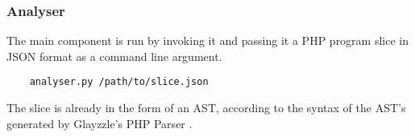 \subsubsection*{Analyser}
\label{sec:expr.analyser}

The main component is run by invoking it and passing it a PHP program slice in
JSON format as a command line argument.

\begin{verbatim}
    analyser.py /path/to/slice.json
\end{verbatim}

The slice is already in the form of an AST, according to the syntax of the AST's
generated by Glayzzle's PHP Parser \cite{glayzzle-php}.
